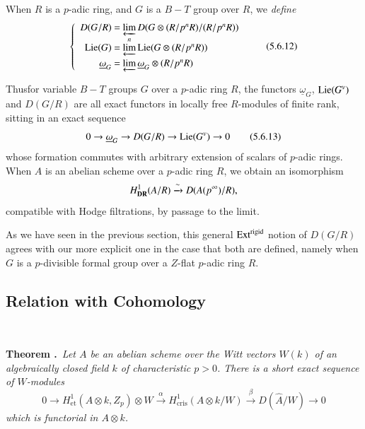 When $R$ is a $p$-adic ring, and $G$ is a $B-T$ group over $R$, we {\em define}
\begin{equation*}
\left\{
\begin{array}{r@{~=~}l}
D(G/R) & \varprojlim\limits_{n} D(G\otimes (R/p^{n}R)/(R/p^{n}R))\\[2pt]
\Lie(G) & \varprojlim \Lie (G\otimes (R/p^{n}R))\\[4pt]
\underline{\omega}_{G} & \varprojlim \underline{\omega}_{G}\otimes (R/p^{n}R)
\end{array}
\right.\tag{5.6.12}\label{art6-eq5.6.12}
\end{equation*}

Thus\pageoriginale for variable $B-T$ groups $G$ over a $p$-adic ring $R$, the functors $\underline{\omega}_{G}$, $\operatorname{Lie}(G^{v})$ and $D(G/R)$ are all exact functors in locally free $R$-modules of finite rank, sitting in an exact sequence
\begin{equation*}
0\to \underline{\omega}_{G}\to D(G/R)\to \operatorname{Lie}(G^{v})\to 0\tag{5.6.13}\label{art6-eq5.6.13}
\end{equation*}
whose formation commutes with arbitrary extension of scalars of $p$-adic rings. When $A$ is an abelian scheme over a $p$-adic ring $R$, we obtain an isomorphism
$$
H^{1}_{\mathbf{DR}}(A/R)\xrightarrow{\sim} D(A(p^{\infty})/R),
$$
compatible with Hodge filtrations, by passage to the limit.

As we have seen in the previous section, this general $\operatorname{Ext}^{\text{rigid}}$ notion of $D(G/R)$ agrees with our more explicit one in the case that both are defined, namely when $G$ is a $p$-divisible formal group over a $Z$-flat $p$-adic ring $R$.

\subsection{Relation with Cohomology}\label{art6-sec5.7}
~

\smallskip
\noindent
{\bf Theorem .\label{art6-thm5.7.1}}~{\em Let $A$ be an abelian scheme over the Witt vectors $W(k)$ of an algebraically closed field $k$ of characteristic $p>0$. There is a short exact sequence of $W$-modules}
$$
0\to H^{1}_{\text{et}}(A\otimes k,Z_{p})\otimes W\xrightarrow{\alpha} H^{1}_{\text{cris}}(A\otimes k/W)\xrightarrow{\beta}D(\widehat{A}/W)\to 0
$$
{\em which is functorial in $A\otimes k$.}
\smallskip

